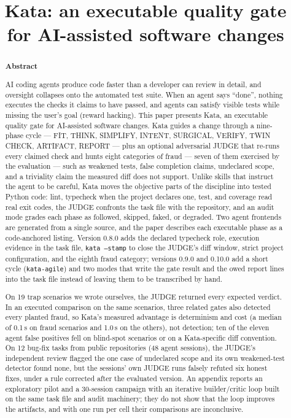 \documentclass{sbc2019}%
\title[Kata: an executable quality gate for AI-assisted software changes]{Kata: an executable quality gate for AI-assisted software changes}
\author[Anonymous]{\affil{\textbf{Omitted for review}}}
\author[Nagai 2026]{
\affil{\textbf{Walter Aoiama Nagai}~\href{https://orcid.org/0000-0001-9078-8396}{\textcolor{orcidlogo}{\aiOrcid}}~~[~\textbf{Instituto de Ciências Tecnológicas, Universidade Federal de Itajubá, Brazil} |\href{mailto:walternagai@unifei.edu.br}{~\textbf{\textit{walternagai@unifei.edu.br}}} ]}
}
\begin{document}
\begin{frontmatter}
\maketitle

\begin{abstract}
\textbf{Abstract}

AI coding agents produce code faster than a developer can review in detail,
and oversight collapses onto the automated test suite. When an agent says
``done'', nothing executes the checks it claims to have passed, and agents can
satisfy visible tests while missing the user's goal (reward hacking). This
paper presents Kata, an executable quality gate for AI-assisted software
changes. Kata guides a change through a nine-phase cycle --- FIT, THINK,
SIMPLIFY, INTENT, SURGICAL, VERIFY, TWIN CHECK, ARTIFACT, REPORT --- plus an
optional adversarial JUDGE that re-runs every claimed check and hunts eight
categories of fraud --- seven of them exercised by the evaluation --- such as
weakened tests, false completion claims, undeclared scope, and a triviality
claim the measured diff does not support. Unlike skills that instruct the
agent to be careful, Kata moves the objective parts of the discipline into
tested Python code: lint, typecheck when the project declares one, test, and
coverage read real exit codes, the JUDGE confronts the task file with the
repository, and an audit mode grades each phase as followed, skipped, faked,
or degraded. Two agent frontends are generated from a single source, and the
paper describes each executable phase as a code-anchored listing. Version
0.8.0 adds the declared typecheck role, execution evidence in the task file,
\texttt{kata --stamp} to close the JUDGE's diff window, strict project
configuration, and the eighth fraud category; versions 0.9.0 and 0.10.0 add a
short cycle (\texttt{kata-agile}) and two modes that write the gate result
and the owed report lines into the task file instead of leaving them to be
transcribed by hand.

On 19 trap scenarios we wrote ourselves, the JUDGE returned every expected
verdict. In an executed comparison on the same scenarios, three related gates
also detected every planted fraud, so Kata's measured advantage is determinism
and cost (a median of 0.1\,s on fraud scenarios and 1.0\,s on the others), not
detection; ten of the eleven agent false positives fell on blind-spot
scenarios or on a Kata-specific diff convention. On 12 bug-fix tasks from
public repositories (48 agent sessions), the JUDGE's independent review
flagged the one case of undeclared scope and its own weakened-test detector
found none, but the sessions' own JUDGE runs falsely refuted six honest
fixes, under a rule corrected after the evaluated version. An appendix reports
an exploratory pilot and a 30-session campaign with an iterative
builder/critic loop built on the same task file and audit machinery; they do
not show that the loop improves the artifacts, and with one run per cell
their comparisons are inconclusive.


\end{abstract}
\end{frontmatter}
\end{document}
